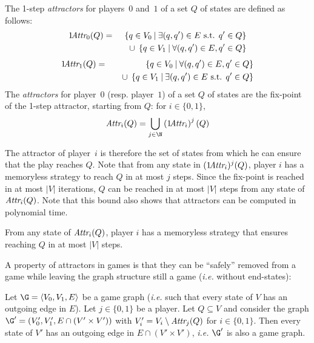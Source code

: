 \begin{definition}
The 1-step \emph{attractors} for players~$0$ and~$1$ of a set $Q$ of states are defined as follows:
\begin{eqnarray*}
1\!\textit{Attr}_{0}(Q) &=& \left\{q \in V_0 \:\middle|\: \exists (q,q') \in E \textrm{ s.t. } q' \in Q \right\}
\\&&\quad
\cup \;\left\{q \in V_1 \:\middle|\: \forall (q,q') \in E, q' \in Q \right\}
\end{eqnarray*}
\begin{eqnarray*}
1\!\textit{Attr}_{1}(Q) &=& \left\{q \in V_0 \:\middle|\: \forall (q,q') \in E, q' \in Q \right\}
\\&&\quad
\cup \;\left\{q \in V_1 \:\middle|\: \exists (q,q') \in E \textrm{ s.t. } q' \in Q \right\}
\end{eqnarray*}
The \emph{attractors} for player~$0$ (resp. player~$1$) of a set $Q$ of states are the fix-point of the 1-step attractor, starting from $Q$: for $i \in \{0,1\}$,
\[\attractor{i}(Q) = \bigcup_{j \in \N} \left(1\!\attractor{i}\right)^j(Q)\]
\end{definition}
The attractor of player~$i$ is therefore the set of states from which he can ensure that the play reaches $Q$.
Note that from any state in $(1\!\textit{Attr}_{i})^j(Q)$, player $i$ has a memoryless strategy to reach $Q$ in at most $j$ steps.
Since the fix-point is reached in at most $|V|$ iterations, $Q$ can be reached in at most $|V|$ steps from any state of $\textit{Attr}_{i}(Q)$.
Note that this bound also shows that attractors can be computed in polynomial time.

\begin{lemma}
From any state of $\textit{Attr}_{i}(Q)$, player $i$ has a memoryless strategy that ensures reaching $Q$ in at most $|V|$ steps.
\end{lemma}

A property of attractors in games is that they can be ``safely'' removed from a game while leaving the graph structure still a game (\emph{i.e.} without end-states):
\begin{lemma}\label{tj:lem:removeattr}
Let $\G = \langle V_0, V_1, E\rangle$ be a game graph (\emph{i.e.} such that every state of $V$ has an outgoing edge in $E$).
Let $j \in \{0,1\}$ be a player.
Let $Q \subseteq V$ and consider the graph $\G' = (V_0', V_1', E \cap (V' \times V'))$ with $V_i' = V_i \setminus \textit{Attr}_{j}(Q)$ for $i \in \{0,1\}$.
Then every state of $V'$ has an outgoing edge in $E \cap (V' \times V')$, \emph{i.e.} $\G'$ is also a game graph.
\end{lemma}

